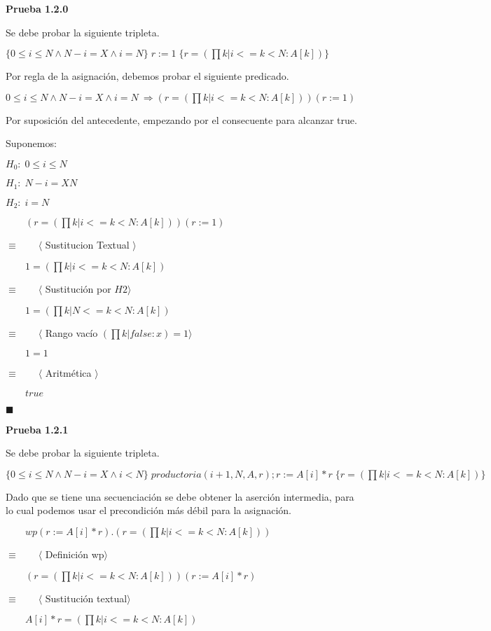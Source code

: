 \documentclass[hidelinks]{article}
\begin{document}
\begin{itemize}
	      \textbf{Prueba 1.2.0}\par
	      Se debe probar la siguiente tripleta.\par
	      $\{0 \leq i \leq N \land N - i = X \land i = N\} \; r := 1 \; \{r = (\prod k | i <= k < N: A[k])\} $\par
	      Por regla de la asignación, debemos probar el siguiente predicado.\par
	      $0 \leq i \leq N \land N - i = X \land i = N\ \Rightarrow (r = (\prod k | i <= k < N: A[k]))(r := 1) $\par
	      Por suposición del antecedente, empezando por el consecuente para alcanzar
	      true.\par
	      Suponemos:\par
	      $H_0: \; 0 \leq i \leq N$\par
	      $H_1: \; N - i = X N$\par
	      $H_2: \; i = N$\par
	      $\qquad (r = (\prod k | i <= k < N: A[k]))(r := 1)$\par
	      $\equiv \qquad \langle$ Sustitucion Textual $\rangle$\par
	      $\qquad 1 = (\prod k | i <= k < N: A[k])$\par
	      $\equiv \qquad \langle$ Sustitución por $H2\rangle$\par
	      $\qquad 1 = (\prod k | N <= k < N: A[k])$\par
	      $\equiv \qquad \langle$ Rango vacío $(\prod k | false: x) = 1\rangle$\par
	      $\qquad 1 = 1$\par
	      $\equiv \qquad \langle$ Aritmética $\rangle$\par
	      $\qquad true$\par
	      $\blacksquare$\par

	      \textbf{Prueba 1.2.1}\par
	      Se debe probar la siguiente tripleta.\par
	      $\{0 \leq i \leq N \land N - i = X \land i < N\} \; productoria(i + 1, N, A, r);r := A[i] * r \; \{r = (\prod k | i <= k < N: A[k])\} $\par
	      Dado que se tiene una secuenciación se debe obtener la aserción intermedia,
	      para lo cual podemos usar el precondición más débil para la asignación.\par
	      $\qquad wp(r := A[i]*r).(r = (\prod k | i <= k < N: A[k]))$\par
	      $\equiv \qquad \langle$ Definición wp$\rangle$\par
	      $\qquad (r = (\prod k | i <= k < N: A[k]))(r := A[i]*r)$\par
	      $\equiv \qquad \langle$ Sustitución textual$\rangle$\par
	      $\qquad A[i]*r = (\prod k | i <= k < N: A[k])$\par


\end{itemize}
\end{document}
